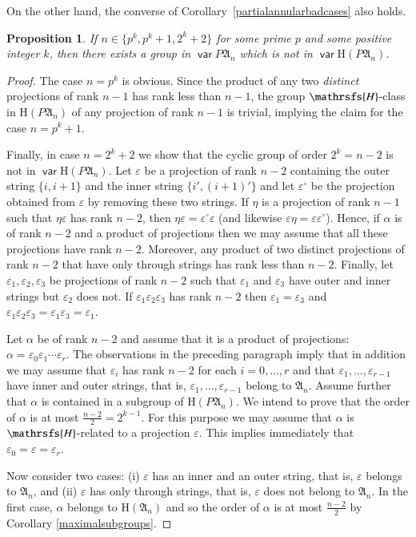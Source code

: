\documentclass[preprint,1p,times]{elsarticle}
\DeclareMathOperator{\var}{\mathsf{var}}
\numberwithin{equation}{section}
\newtheorem{Prop}[Thm]{Proposition}
\theoremstyle{remark}
\def\Hc{\mathrsfs{H}}
\def\al{\alpha}
\def\ep{\varepsilon}
\def\H{\mathrm H}
\def\A{\mathfrak{A}}
\begin{document}
On the other hand, the converse of Corollary~\ref{partialannularbadcases} also holds.

\begin{Prop}
\label{partialannulargoodcases} If $n\in\{p^k,p^k+1,2^k+2\}$ for some prime $p$ and some positive integer $k$, then
there exists a group in $\var P\A_n$ which is not in $\var\H(P\A_n)$.
\end{Prop}

\begin{proof} The case $n=p^k$ is obvious. Since the product of any two
\emph{distinct} projections of rank $n-1$ has rank less than $n-1$, the group $\Hc$-class in $\H(P\A_n)$ of any
projection of rank $n-1$ is trivial, implying the claim for the case $n=p^k+1$.

Finally, in case $n=2^k+2$ we show that the cyclic group of order $2^k=n-2$ is not in $\var\H(P\A_n)$. Let $\ep$ be a
projection of rank $n-2$ containing the outer string $\{i,i+1\}$ and the inner string $\{i',(i+1)'\}$ and let
$\ep^\circ$ be the projection obtained from $\ep$ by removing these two strings. If $\eta$ is a projection of rank
$n-1$ such that $\eta\ep$ has rank $n-2$, then $\eta\ep=\ep^\circ\ep$ (and likewise $\ep\eta=\ep\ep^\circ$). Hence, if
$\al$ is of rank $n-2$ and a product of projections then we may assume that all these projections have rank  $n-2$.
Moreover, any product of two distinct projections of rank $n-2$ that have only through strings has rank less than
$n-2$. Finally, let $\ep_1, \ep_2, \ep_3$ be projections of rank $n-2$ such that $\ep_1$ and $\ep_3$ have outer and
inner strings but $\ep_2$ does not. If $\ep_1\ep_2\ep_3$ has rank $n-2$ then $\ep_1=\ep_3$ and
$\ep_1\ep_2\ep_3=\ep_1\ep_3=\ep_1$.

Let $\alpha$ be of rank $n-2$ and assume that it is a product of projections: $\alpha=\ep_0\ep_1\cdots \ep_r$. The
observations in the preceding paragraph imply that in addition we may assume that $\ep_i$ has rank $n-2$ for each
$i=0,\dots,r$ and that $\ep_1,\dots, \ep_{r-1}$ have inner and outer strings, that is, $\ep_1,\dots, \ep_{r-1}$ belong
to $\A_n$. Assume further that $\alpha$ is contained in a subgroup of $\H (P\A_n)$. We intend to prove that the order
of $\alpha$ is at most $\frac{n-2}2=2^{k-1}$. For this purpose we may assume that $\alpha$ is $\Hc$-related to a
projection $\ep$. This implies immediately that $\ep_0=\ep=\ep_r$.

Now consider two cases: (i) $\ep$ has an inner and an outer string, that is, $\ep$ belongs to $\A_n$, and (ii) $\ep$
has only through strings, that is, $\ep$ does not belong to $\A_n$. In the first case, $\alpha$ belongs to $\H(\A_n)$
and so the order of $\alpha$ is at most $\frac{n-2}2$ by Corollary \ref{maximalsubgroups}.


\end{proof}
\end{document}
